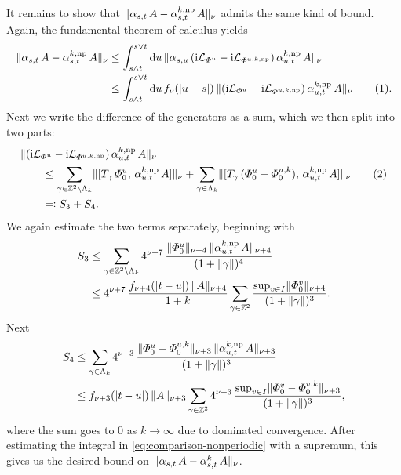 \documentclass[a4paper]{article}
\renewcommand{\i}{\mathrm{i}}
\renewcommand{\Phi}{\varPhi}
\newcommand{\Z}{\mathbb{Z}}
\newcommand{\mL}{\mathcal{L}}
\newcommand{\dd}{\mathrm{d}}
\DeclarePairedDelimiter\norm{\lVert}{\rVert}
\DeclarePairedDelimiter\abs{\lvert}{\rvert}
\theoremstyle{plain}
\theoremstyle{definition}
\theoremstyle{remark}
\newcommand\numberthis{\addtocounter{equation}{1}\tag{\theequation}}
\renewcommand{\(}{\left(}
\renewcommand{\)}{\right)}
\begin{document}
    It remains to show that $\norm{\alpha_{s,t}\, A - \alpha_{s,t}^{k,\mathrm{np}} \, A}_\nu$ admits the same kind of bound. Again, the fundamental theorem of calculus  yields
    \begin{align*}
    \norm{\alpha_{s,t} \, A - \alpha_{s,t}^{k, \mathrm{np}} \, A }_{\nu} 
        &\leq 
        \int_{s\land t}^{s\lor t} \dd u \, \norm{\alpha_{s,u} \,  (\i\mL_{\Phi^u} - \i\mL_{\Phi^{u,k,\mathrm{np}}}) \, \alpha_{u,t}^{k,\mathrm{np}} \, A }_\nu
        \\
        &\leq
        \int_{s\land t}^{s\lor t} \dd u \, f_\nu(\abs{u-s}) \, \norm{  (\i \mL_{\Phi^u} - \i \mL_{\Phi^{u,k,\mathrm{np}}}) \, \alpha_{u,t}^{k,\mathrm{np}} \, A }_\nu \numberthis \label{eq:comparison-nonperiodic}
        .
    \end{align*}
    Next we write the difference of the generators as a sum, which we then split into two parts:
    \begin{align*}
        \hspace{2em}&\hspace{-2em}
        \norm{  (\i \mL_{\Phi^u} - \i \mL_{\Phi^{u,k,\mathrm{np}}}) \, \alpha_{u,t}^{k,\mathrm{np}} \, A }_\nu
        \\
        &\leq
        \sum_{\gamma \in \Z^2\setminus \Lambda_k} \norm{[T_\gamma \, \Phi_0^u, \, \alpha^{k,\mathrm{np}}_{u,t}\, A ]}_\nu 
        + \sum_{\gamma \in \Lambda_k} 
        \norm{
            [
                T_\gamma \, (\Phi_0^u - \Phi^{u,k}_0)
            ,\, 
                \alpha^{k,\mathrm{np}}_{u,t}\, A
            ]
        }_\nu
        \numberthis \label{eqn:splitSj}
        \\
        &\eqcolon
        S_3 + S_4 .
    \end{align*}
    We again estimate the two terms separately, beginning with
    \begin{align*}
        S_3 
        &\leq 
        \sum_{\gamma \in \Z^2\setminus \Lambda_k} 4^{\nu+7} \, \frac{\norm{\Phi^u_0}_{\nu+4} \, \norm{\alpha^{k,\mathrm{np}}_{u,t}\, A}_{\nu+4}}{(1+\norm{\gamma})^{4}}
        \\
        &\leq 
        4^{\nu+7}\, \frac{f_{\nu+4}(\abs{t-u}) \,   \norm{A}_{\nu+4}}{1+k} \sum_{\gamma \in \Z^2} \frac{\sup_{v\in I} \norm{\Phi^v_0}_{\nu+4}}{(1+\norm{\gamma})^3} 
        .
    \end{align*}
    Next
    \begin{align*}
        S_4 
        &\leq
        \sum_{\gamma \in  \Lambda_k} 4^{\nu+3} \, \frac{\norm{\Phi^u_0- \Phi^{u,k}_0}_{\nu+3} \, \norm{\alpha^{k,\mathrm{np}}_{u,t}\, A}_{\nu+3}}{(1+\norm{\gamma})^{3}}
        \\
        &\leq
        f_{\nu+3}(\abs{t-u}) \,\norm{A}_{\nu+3} \sum_{\gamma \in  \Z^2} 4^{\nu+3} \, \frac{\sup_{v\in I}\norm{\Phi^v_0- \Phi^{v,k}_0}_{\nu+3}  }{(1+\norm{\gamma})^{3}}
        ,
    \end{align*}
    where the sum goes to $0$ as $k \to \infty$ due to dominated convergence. After estimating the integral in \eqref{eq:comparison-nonperiodic} with a supremum, this gives us the desired bound on $\norm{\alpha_{s,t} \, A - \alpha_{s,t}^{k} \, A }_{\nu}$.
\end{document}
